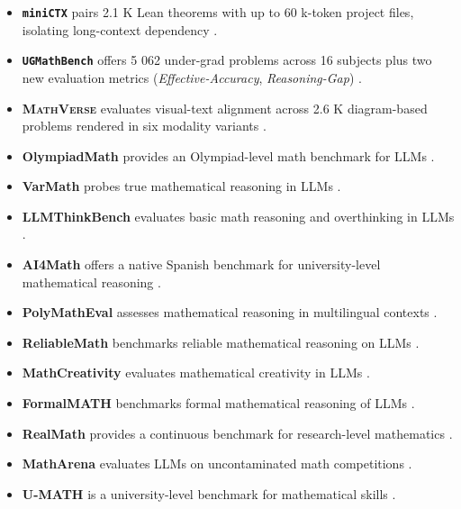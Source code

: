 \documentclass[acmsmall,anonymous]{acmart}
\begin{document}
\begin{itemize}
    \item \textbf{\texttt{miniCTX}} pairs 2.1 K Lean theorems with up to 60 k-token project files, isolating long-context dependency \cite{Hu2025miniCTX}.
    \item \textbf{\texttt{UGMathBench}} offers 5 062 under-grad problems across 16 subjects plus two new evaluation metrics (\textit{Effective-Accuracy}, \textit{Reasoning-Gap}) \cite{Xu2025UGMathBench}.
    \item \textbf{\textsc{MathVerse}} evaluates visual-text alignment across 2.6 K diagram-based problems rendered in six modality variants \cite{zhang2024mathverse}.
    \item \textbf{OlympiadMath} provides an Olympiad-level math benchmark for LLMs \cite{anonymous2025olympiadmath,anonymous2025olympiadmath}.
    \item \textbf{VarMath} probes true mathematical reasoning in LLMs \cite{anonymous2025varmath,anonymous2025varmath}.
    \item \textbf{LLMThinkBench} evaluates basic math reasoning and overthinking in LLMs \cite{anonymous2025llmthinkbench,anonymous2025llmthinkbench}.
    \item \textbf{AI4Math} offers a native Spanish benchmark for university-level mathematical reasoning \cite{perez2025ai4mathnativespanishbenchmark}.
    \item \textbf{PolyMathEval} assesses mathematical reasoning in multilingual contexts \cite{anonymous2025polymatheval,anonymous2025polymatheval}.
    \item \textbf{ReliableMath} benchmarks reliable mathematical reasoning on LLMs \cite{anonymous2025reliablemath,anonymous2025reliablemath}.
    \item \textbf{MathCreativity} evaluates mathematical creativity in LLMs \cite{anonymous2025benchmarkmathcreativity,anonymous2025benchmarkmathcreativity}.
    \item \textbf{FormalMATH} benchmarks formal mathematical reasoning of LLMs \cite{yu2025formalmath}.
    \item \textbf{RealMath} provides a continuous benchmark for research-level mathematics \cite{zhang2025realmath}.
    \item \textbf{MathArena} evaluates LLMs on uncontaminated math competitions \cite{balunovic2025matharena}.
    \item \textbf{U-MATH} is a university-level benchmark for mathematical skills \cite{chernyshev-etal-2025-u,depaiva2025mathnli,anonymous2025enigmata,he2024bolympiadbench,li2024c numinamath,toshniwal2024a openmathinstruct2,toshniwal2024b openmathinstruct1,paster2024openwebmath,wei2023cmath,liu2023augmenting,huang2024key,fang2024,kurtic2024,mao2024,mirzadeh2024,zeng2024,han2024,liu2024b,liang2024c,lu2024b,chernyshev2024,lu2024c}.

\end{itemize}
\end{document}
